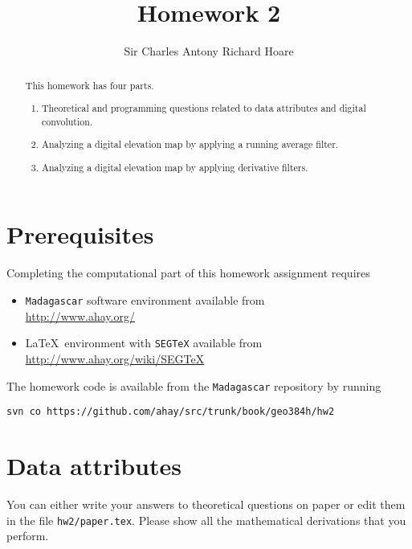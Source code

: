 \author{Sir Charles Antony Richard Hoare}
\title{Homework 2}

\begin{abstract}
  This homework has four parts. 
  \begin{enumerate}
  \item Theoretical and programming questions related to data attributes and digital convolution.  
  \item Analyzing a digital elevation map by applying a running average filter.
  \item Analyzing a digital elevation map by applying derivative filters.
  \end{enumerate}
\end{abstract}

\section{Prerequisites}

Completing the computational part of this homework assignment requires
\begin{itemize}
\item \texttt{Madagascar} software environment available from \\
\url{http://www.ahay.org/}
\item \LaTeX\ environment with \texttt{SEGTeX} available from \\ 
\url{http://www.ahay.org/wiki/SEGTeX}
\end{itemize}

The homework code is available from the \texttt{Madagascar} repository
by running
\begin{verbatim}
svn co https://github.com/ahay/src/trunk/book/geo384h/hw2
\end{verbatim}

\section{Data attributes}

You can either write your answers to theoretical questions on paper or
edit them in the file \texttt{hw2/paper.tex}. Please show all the
mathematical derivations that you perform.

